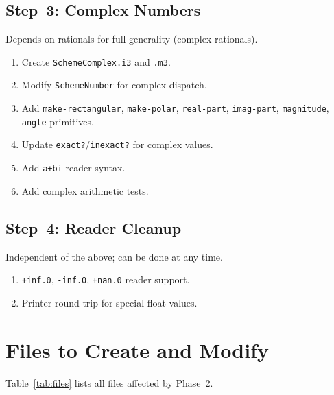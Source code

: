 \documentclass[12pt]{article}
\begin{document}
\subsection{Step~3: Complex Numbers}

Depends on rationals for full generality (complex rationals).

\begin{enumerate}[nosep]
\item Create {\tt SchemeComplex.i3} and {\tt .m3}.
\item Modify {\tt SchemeNumber} for complex dispatch.
\item Add {\tt make-rectangular}, {\tt make-polar}, {\tt real-part},
  {\tt imag-part}, {\tt magnitude}, {\tt angle} primitives.
\item Update {\tt exact?}/{\tt inexact?} for complex values.
\item Add {\tt a+bi} reader syntax.
\item Add complex arithmetic tests.
\end{enumerate}

\subsection{Step~4: Reader Cleanup}

Independent of the above; can be done at any time.

\begin{enumerate}[nosep]
\item {\tt +inf.0}, {\tt -inf.0}, {\tt +nan.0} reader support.
\item Printer round-trip for special float values.
\end{enumerate}


\section{Files to Create and Modify}
\label{sec:files}

Table~\ref{tab:files} lists all files affected by Phase~2.
\end{document}
